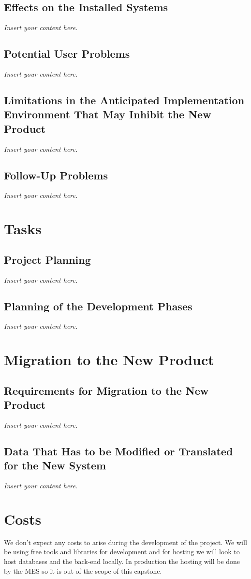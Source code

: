 \documentclass[12pt]{article}
\newcommand{\lips}{\textit{Insert your content here.}}
\begin{document}
\subsection{Effects on the Installed Systems}
\lips
\subsection{Potential User Problems}
\lips
\subsection{Limitations in the Anticipated Implementation Environment That May
Inhibit the New Product}
\lips
\subsection{Follow-Up Problems}
\lips

\section{Tasks}
\subsection{Project Planning}
\lips
\subsection{Planning of the Development Phases}
\lips

\section{Migration to the New Product}
\subsection{Requirements for Migration to the New Product}
\lips
\subsection{Data That Has to be Modified or Translated for the New System}
\lips

\section{Costs}
We don't expect any costs to arise during the development of the project. We will be using free tools and libraries for development and for hosting we will look to host databases and the back-end locally. In production the hosting will be done by the MES so it is out of the scope of this capstone.
\end{document}
